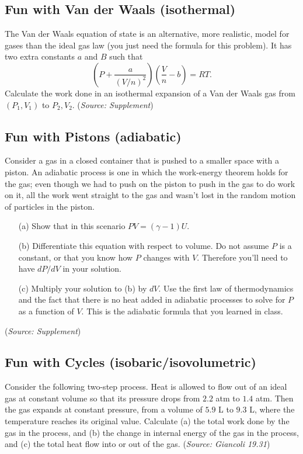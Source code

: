 \documentclass{article}
\begin{document}
\subsection{Fun with Van der Waals (isothermal)}

The Van der Waals equation of state is an alternative, more realistic, model for gases than the ideal gas law (you just need the formula for this problem). It has two extra constants $a$ and $B$ such that
\begin{equation}
(P+\frac{a}{(V/n)^2})(\frac{V}{n}-b) = RT.
\end{equation}
Calculate the work done in an isothermal expansion of a Van der Waals gas from $(P_1, V_1)$ to $P_2, V_2$. (\textit{Source: Supplement})

\subsection{Fun with Pistons (adiabatic)}

Consider a gas in a closed container that is pushed to a smaller space with a piston. An adiabatic process is one in which the work-energy theorem holds for the gas; even though we had to push on the piston to push in the gas to do work on it, all the work went straight to the gas and wasn't lost in the random motion of particles in the piston.
\begin{itemize}
	\item[(a)] Show that in this scenario $PV = (\gamma-1)U$.
	\item[(b)] Differentiate this equation with respect to volume. Do not assume $P$ is a constant, or that you know how $P$ changes with $V$. Therefore you'll need to have $dP/dV$ in your solution.
	\item[(c)] Multiply your solution to (b) by $dV$. Use the first law of thermodynamics and the fact that there is no heat added in adiabatic processes to solve for $P$ as a function of $V$. This is the adiabatic formula that you learned in class.
\end{itemize}
(\textit{Source: Supplement})

\subsection{Fun with Cycles (isobaric/isovolumetric)}

Consider the following two-step process. Heat is allowed to flow out of an ideal gas at constant volume so that its pressure drops from $2.2$ atm to $1.4$ atm. Then the gas expands at constant pressure, from a volume of $5.9$ L to $9.3$ L, where the temperature reaches its original value. Calculate (a) the total work done by the gas in the process, and (b) the change in internal energy of the gas in the process, and (c) the total heat flow into or out of the gas. (\textit{Source: Giancoli 19.31})
\end{document}
